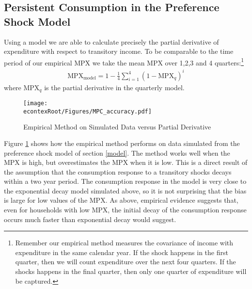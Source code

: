 \documentclass[titlepage]{\econtex}\newcommand{\texname}{ConsumptionHeterogeneity}
\begin{document}
\subsection{Persistent Consumption in the Preference Shock Model}
Using a model we are able to calculate precisely the partial derivative of expenditure with respect to transitory income. To be comparable to the time period of our empirical MPX we take the mean MPX over 1,2,3 and 4 quarters:\footnote{Remember our empirical method measures the covariance of income with expenditure in the same calendar year. If the shock happens in the first quarter, then we will count expenditure over the next four quarters. If the shocks happens in the final quarter, then only one quarter of expenditure will be captured.}
\begin{align*}
\text{MPX}_{\text{model}} = 1 - \frac{1}{4}\sum_{i=1}^{4}(1-\text{MPX}_q)^i 
\end{align*}
where $\text{MPX}_q$ is the partial derivative in the quarterly model.
\begin{figure} 
	\begin{centering}
		\texttt{[image: \\econtexRoot/Figures/MPC\_accuracy.pdf]}
		\caption{Empirical Method on Simulated Data versus Partial Derivative}
		\label{fig:MPC_accuracy}
	\end{centering}
\end{figure}

Figure \ref{fig:MPC_accuracy} shows how the empirical method performs on data simulated from the preference shock model of section \ref{model}. The method works well when the MPX is high, but overestimates the MPX when it is low. This is a direct result of the assumption that the consumption response to a transitory shocks decays within a two year period. The consumption response in the model is very close to the exponential decay model simulated above, so it is not surprising that the bias is large for low values of the MPX. As above, empirical evidence suggests that, even for households with low MPX, the initial decay of the consumption response occurs much faster than exponential decay would suggest.
\end{document}
